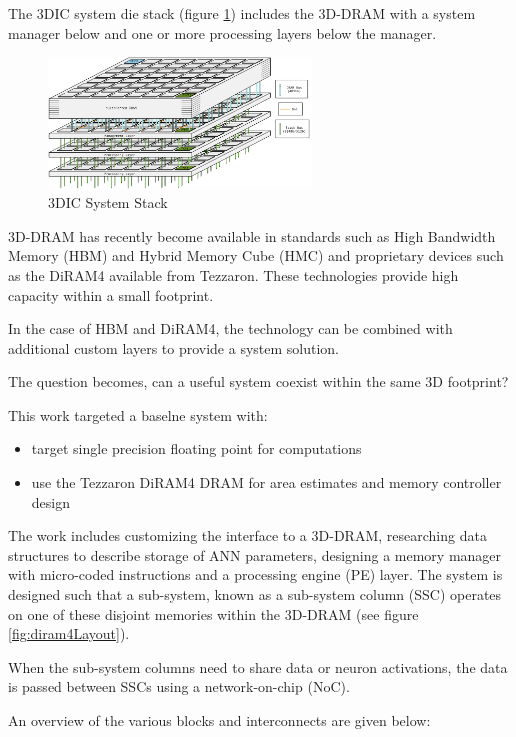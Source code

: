 \documentclass[journal]{IEEEtran}
\begin{document}
The 3DIC system die stack (figure \ref{fig:3DICStack}) includes the 3D-DRAM with a system manager below and one or more processing layers below the manager.
\begin{figure}[!t]
\centerline{
\mbox{\includegraphics[width=2.75in]{StackDiagram.jpg}}
}
\caption{3DIC System Stack}
\label{fig:3DICStack}
\end{figure}

3D-DRAM has recently become available in standards such as High Bandwidth Memory (HBM) and Hybrid Memory Cube (HMC) and proprietary devices such as the DiRAM4 available from Tezzaron. 
These technologies provide high capacity within a small footprint.

In the case of HBM and DiRAM4, the technology can be combined with additional custom layers to provide a system solution.

The question becomes, can a useful system coexist within the same 3D footprint?

This work targeted a baselne system with:
\begin{itemize}
  \itemsep0em 
  \item target single precision floating point for computations
  \item use the Tezzaron DiRAM4 DRAM for area estimates and memory controller design
\end{itemize}
The work includes customizing the interface to a 3D-DRAM, researching data structures to describe storage of ANN parameters, designing a memory manager with micro-coded instructions and a processing engine (PE) layer.  
The system is designed such that a sub-system, known as a sub-system column (SSC) operates on one of these disjoint memories within the 3D-DRAM  (see figure \ref{fig:diram4Layout}).

When the sub-system columns need to share data or neuron activations, the data is passed between SSCs using a network-on-chip (NoC).

An overview of the various blocks and interconnects are given below:

\end{document}
